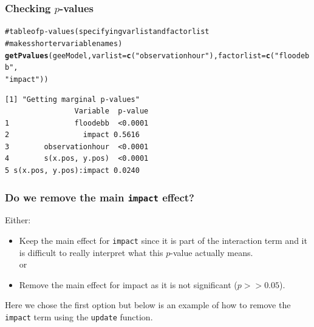 \documentclass[11pt, a4paper]{article}
\makeatletter
\newcommand{\hlfunctioncall}[1]{\textcolor[rgb]{0.501960784313725,0,0.329411764705882}{\textbf{#1}}}%
\newcommand{\hlstring}[1]{\textcolor[rgb]{0.6,0.6,1}{#1}}%
\newcommand{\hlcomment}[1]{\textcolor[rgb]{0.180392156862745,0.6,0.341176470588235}{#1}}%
\newenvironment{kframe}{%
 \def\at@end@of@kframe{}%
 \ifinner\ifhmode%
  \def\at@end@of@kframe{\end{minipage}}%
  \begin{minipage}{\columnwidth}%
 \fi\fi%
 \def\FrameCommand##1{\hskip\@totalleftmargin \hskip-\fboxsep
 \colorbox{shadecolor}{##1}\hskip-\fboxsep
     \hskip-\linewidth \hskip-\@totalleftmargin \hskip\columnwidth}%
 \MakeFramed {\advance\hsize-\width
   \@totalleftmargin\z@ \linewidth\hsize
   \@setminipage}}%
 {\par\unskip\endMakeFramed%
 \at@end@of@kframe}
\newenvironment{knitrout}{}{} %
\makeatother
\begin{document}
\begin{frame}[fragile]
\frametitle{Checking $p$-values}
\begin{knitrout}\footnotesize
{}\color{fgcolor}\begin{kframe}
\begin{alltt}
\hlcomment{# table of p-values (specifying varlist and factorlist}
\hlcomment{# makes shorter variable names)}
\hlfunctioncall{getPvalues}(geeModel, varlist = \hlfunctioncall{c}(\hlstring{"observationhour"}), factorlist = \hlfunctioncall{c}(\hlstring{"floodebb"}, 
    \hlstring{"impact"}))
\end{alltt}
\begin{verbatim}
[1] "Getting marginal p-values"
                Variable  p-value
1               floodebb  <0.0001
2                 impact 0.5616
3        observationhour  <0.0001
4        s(x.pos, y.pos)  <0.0001
5 s(x.pos, y.pos):impact 0.0240
\end{verbatim}
\end{kframe}
\end{knitrout}

\end{frame}


\begin{frame}[fragile]
\frametitle{Do we remove the main {\tt impact} effect?}
Either:
\begin{itemize}
\item Keep the main effect for {\tt impact} since it is part of the interaction term and it is difficult to really interpret what this $p$-value actually means.\\

\noindent or\\
\item Remove the main effect for impact as it is not significant ($p>>0.05$).
\end{itemize}

\bigskip
Here we chose the first option but below is an example of how to remove the {\tt impact} term using the {\tt update} function.
\end{frame}
\end{document}
